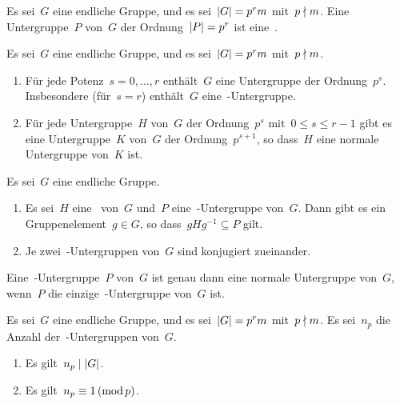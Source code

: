 \begin{definition}
  Es sei~$G$ eine endliche Gruppe, und es sei~$\lvert G\rvert = p^r m$ mit~$p \nmid m$.
  Eine Untergruppe~$P$ von~$G$ der Ordnung~$\lvert P\rvert = p^r$ ist eine~.
\end{definition}

\begin{theorem}
  Es sei~$G$ eine endliche Gruppe, und es sei~$\lvert G\rvert = p^r m$ mit~$p \nmid m$.
  \begin{enumerate}
    \item
      Für jede Potenz~$s = 0, \dotsc, r$ enthält~$G$ eine Untergruppe der Ordnung~$p^s$.
      Insbesondere (für~$s = r$) enthält~$G$ eine~-Untergruppe.
    \item
      Für jede Untergruppe~$H$ von~$G$ der Ordnung~$p^s$ mit~$0 \leq s \leq r-1$ gibt es eine Untergruppe~$K$ von~$G$ der Ordnung~$p^{s+1}$, so dass~$H$ eine normale Untergruppe von~$K$ ist.
  \end{enumerate}
\end{theorem}

\begin{theorem}
  Es sei~$G$ eine endliche Gruppe.
  \begin{enumerate}
    \item
      Es sei~$H$ eine~ von~$G$ und~$P$ eine~-Untergruppe von~$G$.
      Dann gibt es ein Gruppenelement~$g \in G$, so dass~$g H g^{-1} \subseteq P$ gilt.
    \item
      Je zwei~-Untergruppen von~$G$ sind konjugiert zueinander.
  \end{enumerate}
\end{theorem}

\begin{corollary}
  Eine~-Untergruppe~$P$ von~$G$ ist genau dann eine normale Untergruppe von~$G$, wenn~$P$ die einzige~-Untergruppe von~$G$ ist.
\end{corollary}

\begin{theorem}
  Es sei~$G$ eine endliche Gruppe, und es sei~$\lvert G\rvert = p^r m$ mit~$p \nmid m$.
  Es sei~$n_p$ die Anzahl der~-Untergruppen von~$G$.
  \begin{enumerate}
    \item
      Es gilt~$n_p \mid \lvert G\rvert$.
    \item
      Es gilt~$n_p \equiv 1 \,(\operatorname{mod} p)$.
  \end{enumerate}
\end{theorem}

